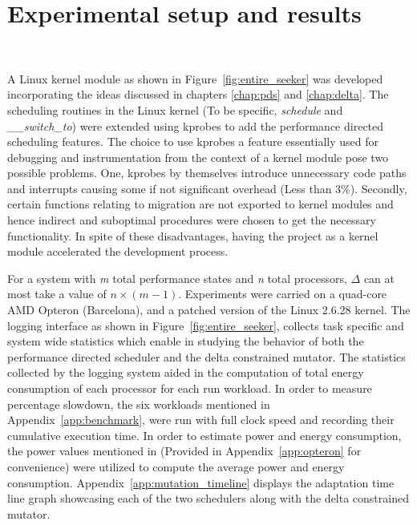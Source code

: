 \chapter{Experimental setup and results}~\label{chap:results}

A Linux kernel module as shown in Figure~\ref{fig:entire_seeker} was developed incorporating the ideas 
discussed in chapters \ref{chap:pds} and \ref{chap:delta}. 
The scheduling routines in the Linux kernel (To be specific, \textit{schedule} and \textit{\_\_switch\_to})
were extended using kprobes \cite{kprobes} to add the performance directed scheduling features.
The choice to use kprobes \cite{kprobes} a feature essentially used for debugging and instrumentation
from the context of a kernel module pose two possible 
problems. One, kprobes by themselves introduce unnecessary code paths and interrupts causing some
if not significant overhead (Less than 3\%). Secondly, certain functions relating to migration are not exported
to kernel modules and hence indirect and suboptimal procedures were chosen to get the necessary 
functionality. In spite of these disadvantages, having the project as a kernel module accelerated 
the development process. 

For a system with \textit{m} total performance states and \textit{n} total processors, $\Delta$ can 
at most take a value of $n \times (m-1)$. Experiments were carried on a quad-core AMD Opteron (Barcelona),
and a patched version of the Linux 2.6.28 kernel. The logging interface as shown in Figure~\ref{fig:entire_seeker},
collects task specific and system wide statistics which enable in studying the behavior of both the performance
directed scheduler and the delta constrained mutator. The statistics collected by the logging system aided in 
the computation of total energy consumption of each processor for each run workload. In order to measure 
percentage slowdown, the six workloads mentioned in Appendix~\ref{app:benchmark}, were run with full clock speed
and recording their cumulative execution time. In order to estimate power and energy consumption, the power 
values mentioned in \cite{AMDPow} (Provided in Appendix~\ref{app:opteron} for convenience) were utilized 
to compute the average power and energy consumption. Appendix~\ref{app:mutation_timeline} displays the 
adaptation time line graph showcasing each of the two schedulers along with the delta constrained mutator.

